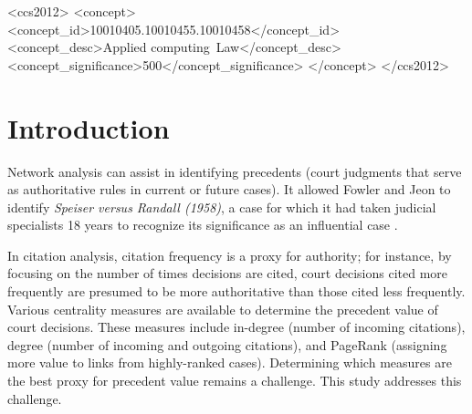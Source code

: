 \documentclass[sigconf]{acmart}
\begin{document}
\begin{CCSXML}
<ccs2012>
   <concept>
       <concept_id>10010405.10010455.10010458</concept_id>
       <concept_desc>Applied computing~Law</concept_desc>
       <concept_significance>500</concept_significance>
       </concept>
 </ccs2012>
\end{CCSXML}




\maketitle

\section{Introduction}
Network analysis can assist in identifying precedents (court judgments that serve as authoritative rules in current or future cases). It allowed Fowler and Jeon to identify \textit{Speiser versus Randall (1958)}, a case for which it had taken judicial specialists 18 years to recognize its significance as an influential case \cite{FOWLER200816}.

In citation analysis, citation frequency is a proxy for authority; for instance, by focusing on the number of times decisions are cited, court decisions cited more frequently are presumed to be more authoritative than those cited less frequently.
Various centrality measures are available to determine the precedent value of court decisions. These measures include in-degree (number of incoming citations), degree (number of incoming and outgoing citations), and PageRank (assigning more value to links from highly-ranked cases). Determining which measures are the best proxy for precedent value remains a challenge. This study addresses this challenge.
\end{document}
